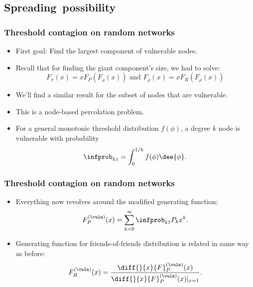 \subsection{Spreading\ possibility}

\begin{frame}
  \frametitle{Threshold contagion on random networks}

  \begin{itemize}
  \item<1-> 
    \alert{First goal:} 
    Find the largest component of vulnerable nodes.
  \item<2-> 
    Recall that for finding the giant component's size, 
    we had to solve:
    $$
    {
      F_{\pi}(x)
      =
      x F_{P}
      \left(
        F_{\rho} (x)
      \right)
    }
    \mbox{\ \  and \ }
    {
      F_{\rho}(x)
      =
      x F_{R}
      \left(
        F_{\rho} (x)
      \right)
    }
    $$
  \item<3-> 
    We'll find a similar result for 
    the subset of nodes that are vulnerable.
  \item<4-> 
    This is a node-based percolation problem.
  \item<5-> 
    For a general monotonic threshold distribution \alert{$f(\phi)$},
    a degree $k$ node is vulnerable with probability
    $$
    \infprob_{k1} = \int_{0}^{1/k} f(\phi) \dee{\phi}.
    $$
  \end{itemize}

\end{frame}

\begin{frame}
  \frametitle{Threshold contagion on random networks}

  \begin{itemize}
  \item<1->
    Everything now revolves around the \alert{modified} generating function:
    $$
    F_P^{(\vuln)}(x) 
    = 
    \sum_{k=0}^{\infty}
    \infprob_{k1}
    P_k
    x^k.
    $$
  \item<2->
    Generating function for friends-of-friends distribution is
    related in same way as before:
    $$
    F_R^{(\vuln)}(x) 
    = 
    \frac{
      \diff{}{x}{F}_P^{(\vuln)}(x)}
    {\diff{}{x} {F}_P^{(\vuln)}(x)|_{x=1}}.
    $$
  \end{itemize}

\end{frame}

